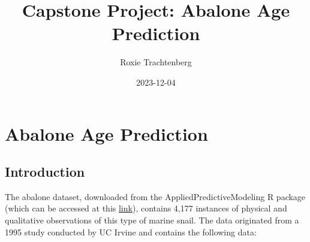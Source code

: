 \documentclass[
]{article}
\title{Capstone Project: Abalone Age Prediction}
\author{Roxie Trachtenberg}
\date{2023-12-04}
\begin{document}
\maketitle

\hypertarget{abalone-age-prediction}{%
\section{Abalone Age Prediction}\label{abalone-age-prediction}}

\hypertarget{introduction}{%
\subsection{Introduction}\label{introduction}}

The abalone dataset, downloaded from the AppliedPredictiveModeling R
package (which can be accessed at this
\href{https://github.com/cran/AppliedPredictiveModeling/tree/master/data}{link}),
contains 4,177 instances of physical and qualitative observations of
this type of marine snail. The data originated from a 1995 study
conducted by UC Irvine and contains the following data:
\end{document}
